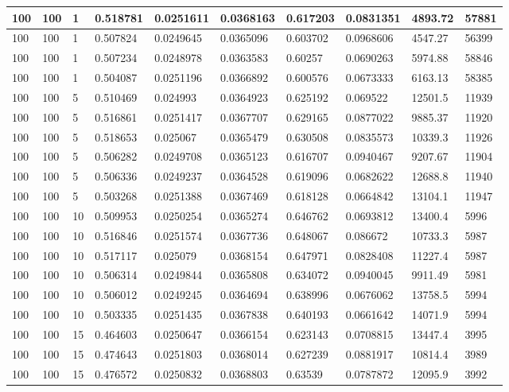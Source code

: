 \begin{landscape}
\begin{longtable}{ | l | l | l | l | l | l | l | l | l | l | }
100 & 100 & 1 & 0.518781 & 0.0251611 & 0.0368163 & 0.617203 & 0.0831351 & 4893.72 & 57881\\ \hline
100 & 100 & 1 & 0.507824 & 0.0249645 & 0.0365096 & 0.603702 & 0.0968606 & 4547.27 & 56399\\ \hline
100 & 100 & 1 & 0.507234 & 0.0248978 & 0.0363583 & 0.60257 & 0.0690263 & 5974.88 & 58846\\ \hline
100 & 100 & 1 & 0.504087 & 0.0251196 & 0.0366892 & 0.600576 & 0.0673333 & 6163.13 & 58385\\ \hline
100 & 100 & 5 & 0.510469 & 0.024993 & 0.0364923 & 0.625192 & 0.069522 & 12501.5 & 11939\\ \hline
100 & 100 & 5 & 0.516861 & 0.0251417 & 0.0367707 & 0.629165 & 0.0877022 & 9885.37 & 11920\\ \hline
100 & 100 & 5 & 0.518653 & 0.025067 & 0.0365479 & 0.630508 & 0.0835573 & 10339.3 & 11926\\ \hline
100 & 100 & 5 & 0.506282 & 0.0249708 & 0.0365123 & 0.616707 & 0.0940467 & 9207.67 & 11904\\ \hline
100 & 100 & 5 & 0.506336 & 0.0249237 & 0.0364528 & 0.619096 & 0.0682622 & 12688.8 & 11940\\ \hline
100 & 100 & 5 & 0.503268 & 0.0251388 & 0.0367469 & 0.618128 & 0.0664842 & 13104.1 & 11947\\ \hline
100 & 100 & 10 & 0.509953 & 0.0250254 & 0.0365274 & 0.646762 & 0.0693812 & 13400.4 & 5996\\ \hline
100 & 100 & 10 & 0.516846 & 0.0251574 & 0.0367736 & 0.648067 & 0.086672 & 10733.3 & 5987\\ \hline
100 & 100 & 10 & 0.517117 & 0.025079 & 0.0368154 & 0.647971 & 0.0828408 & 11227.4 & 5987\\ \hline
100 & 100 & 10 & 0.506314 & 0.0249844 & 0.0365808 & 0.634072 & 0.0940045 & 9911.49 & 5981\\ \hline
100 & 100 & 10 & 0.506012 & 0.0249245 & 0.0364694 & 0.638996 & 0.0676062 & 13758.5 & 5994\\ \hline
100 & 100 & 10 & 0.503335 & 0.0251435 & 0.0367838 & 0.640193 & 0.0661642 & 14071.9 & 5994\\ \hline
100 & 100 & 15 & 0.464603 & 0.0250647 & 0.0366154 & 0.623143 & 0.0708815 & 13447.4 & 3995\\ \hline
100 & 100 & 15 & 0.474643 & 0.0251803 & 0.0368014 & 0.627239 & 0.0881917 & 10814.4 & 3989\\ \hline
100 & 100 & 15 & 0.476572 & 0.0250832 & 0.0368803 & 0.63539 & 0.0787872 & 12095.9 & 3992\\ \hline

\end{longtable}
\end{landscape}
